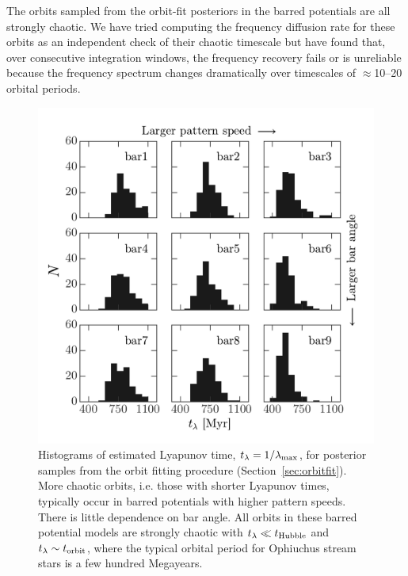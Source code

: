 The orbits sampled from the orbit-fit posteriors in the barred potentials are all strongly chaotic. We have tried computing the frequency diffusion rate for these orbits as an independent check of their chaotic timescale but have found that, over consecutive integration windows, the frequency recovery fails or is unreliable because the frequency spectrum changes dramatically over timescales of $\approx$10--20 orbital periods. 

\begin{figure}[!tbp]
\begin{center}
\includegraphics[width=\textwidth]{figures/ch4/lyapunov-hist}
\caption{ Histograms of estimated Lyapunov time, $t_\lambda=1/\lambda_{\rm max}$, for posterior samples from the orbit fitting procedure (Section~\ref{sec:orbitfit}). More chaotic orbits, i.e. those with shorter Lyapunov times, typically occur in barred potentials with higher pattern speeds. There is little dependence on bar angle. All orbits in these barred potential models are strongly chaotic with $t_\lambda \ll t_{\rm Hubble}$ and $t_\lambda \sim t_{\rm orbit}$, where the typical orbital period for Ophiuchus stream stars is a few hundred Megayears.}
\label{fig:lyapunov-hist}
\end{center}
\end{figure}


